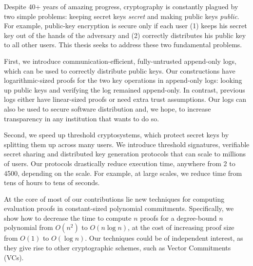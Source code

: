 % 
% 
%

Despite 40+ years of amazing progress, cryptography is constantly plagued by two simple problems: keeping secret keys \textit{secret} and making public keys \textit{public}.
For example, public-key encryption is secure only if each user (1) keeps his secret key out of the hands of the adversary and (2) correctly distributes his public key to all other users.
This thesis seeks to address these two fundamental problems.

First, we introduce communication-efficient, fully-untrusted append-only logs, which can be used to correctly distribute public keys. 
Our constructions have logarithmic-sized proofs for the two key operations in append-only logs: looking up public keys and verifying the log remained append-only. 
In contrast, previous logs either have linear-sized proofs or need extra trust assumptions.
Our logs can also be used to secure software distribution and, we hope, to increase transparency in any institution that wants to do so.

Second, we speed up threshold cryptosystems, which protect secret keys by splitting them up across many users.
We introduce threshold signatures, verifiable secret sharing and distributed key generation protocols that can scale to millions of users. 
Our protocols drastically reduce execution time, anywhere from 2\texttimes\xspace to 4500\texttimes, depending on the scale. 
For example, at large scales, we reduce time from tens of hours to tens of seconds.

At the core of most of our contributions lie new techniques for computing evaluation proofs in constant-sized polynomial commitments.
Specifically, we show how to decrease the time to compute $n$ proofs for a degree-bound $n$ polynomial from $O(n^2)$ to $O(n\log{n})$, at the cost of increasing proof size from $O(1)$ to $O(\log{n})$. 
Our techniques could be of independent interest, as they give rise to other cryptographic schemes, such as Vector Commitments (VCs).

